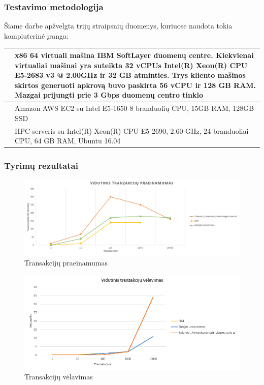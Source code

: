 \documentclass{VUMIFPSkursinis}
\begin{document}
\subsubsection{Testavimo metodologija}
Šiame darbe apžvelgta trijų straipsnių duomenys, kuriuose naudota tokia kompiuterinė įranga:
\begin{center}
\begin{tabular}{ | m{5em} | m{10cm}| } 
\hline
\cite{IMBResearch}& x86 64 virtuali mašina IBM SoftLayer duomenų centre. 
Kiekvienai virtualiai mašinai yra suteikta 32 vCPUs Intel(R) Xeon(R)
CPU E5-2683 v3 @ 2.00GHz ir 32 GB atminties. Trys kliento mašinos skirtos generuoti apkrovą buvo paskirta
56 vCPU ir 128 GB RAM. Mazgai prijungti prie 3 Gbps duomenų centro tinklo \\ 
\hline
\cite{ThailandPerf}& Amazon AWS EC2
su Intel E5-1650 8 branduolių CPU,
15GB RAM, 128GB SSD \\ 
\hline
\cite{ShaFabPerf}& HPC serveris
su Intel(R) Xeon(R) CPU E5-2690, 2.60 GHz, 24 branduoliai
CPU, 64 GB RAM, Ubuntu 16.04 \\ 
\hline
\end{tabular}
\end{center}

\subsubsection{Tyrimų rezultatai}
\begin{figure}[H]
\centering
\includegraphics[scale=0.8]{img/Praein}
\caption{Transakcijų praeinamumas} %
\label{img:mlp}
\end{figure} 
\begin{figure}[H]
\centering
\includegraphics[scale=0.8]{img/Velav}
\caption{Transakcijų vėlavimas} %
\label{img:mlp}
\end{figure} 
\end{document}
